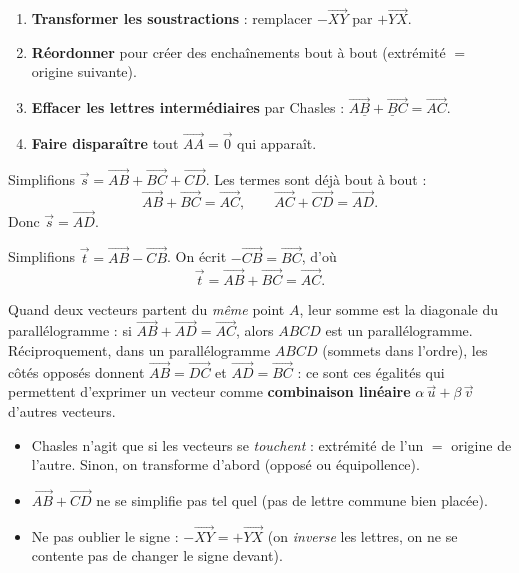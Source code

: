 \documentclass[11pt,a4paper]{article}
\newcommand{\vc}[1]{\overrightarrow{#1}}
\begin{document}
\begin{methode}
\begin{enumerate}[leftmargin=1.7em,topsep=2pt,itemsep=2pt]
  \item \textbf{Transformer les soustractions} : remplacer $-\vc{XY}$ par $+\vc{YX}$.
  \item \textbf{Réordonner} pour créer des enchaînements bout à bout (extrémité $=$ origine suivante).
  \item \textbf{Effacer les lettres intermédiaires} par Chasles : $\vc{A\underline{B}}+\vc{\underline{B}C}=\vc{AC}$.
  \item \textbf{Faire disparaître} tout $\vc{AA}=\vec0$ qui apparaît.
\end{enumerate}
\end{methode}

\begin{exemple}
Simplifions $\vec s=\vc{AB}+\vc{BC}+\vc{CD}$. Les termes sont déjà bout à bout :
\[
  \vc{AB}+\vc{BC}=\vc{AC},\qquad \vc{AC}+\vc{CD}=\vc{AD}.
\]
Donc $\vec s=\vc{AD}$.
\end{exemple}

\begin{exemple}
Simplifions $\vec t=\vc{AB}-\vc{CB}$. On écrit $-\vc{CB}=\vc{BC}$, d'où
\[
  \vec t=\vc{AB}+\vc{BC}=\vc{AC}.
\]
\end{exemple}

\begin{idee}
Quand deux vecteurs partent du \emph{même} point $A$, leur somme est la diagonale du parallélogramme :
si $\vc{AB}+\vc{AD}=\vc{AC}$, alors $ABCD$ est un parallélogramme. Réciproquement, dans un
parallélogramme $ABCD$ (sommets dans l'ordre), les côtés opposés donnent
$\vc{AB}=\vc{DC}$ et $\vc{AD}=\vc{BC}$ : ce sont ces égalités qui permettent d'exprimer un vecteur
comme \textbf{combinaison linéaire} $\alpha\,\vec u+\beta\,\vec v$ d'autres vecteurs.
\end{idee}

\begin{piege}
\begin{itemize}[leftmargin=1.5em,topsep=2pt,itemsep=1pt]
  \item Chasles n'agit que si les vecteurs se \emph{touchent} : extrémité de l'un $=$ origine de l'autre.
        Sinon, on transforme d'abord (opposé ou équipollence).
  \item $\vc{AB}+\vc{CD}$ ne se simplifie pas tel quel (pas de lettre commune bien placée).
  \item Ne pas oublier le signe : $-\vc{XY}=+\vc{YX}$ (on \emph{inverse} les lettres, on ne se contente
        pas de changer le signe devant).
\end{itemize}
\end{piege}
\end{document}
